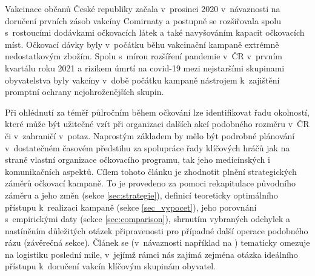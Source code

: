 Vakcinace občanů České republiky začala v~prosinci 2020 v~návaznosti na doručení prvních zásob vakcíny Comirnaty a postupně se rozšiřovala spolu s~rostoucími dodávkami očkovacích látek a také navyšováním kapacit očkovacích míst. %
%
Očkovací dávky byly v~počátku běhu vakcinační kampaně extrémně nedostatkovým zbožím. Spolu s~mírou rozšíření pandemie v~ČR v~prvním kvartálu roku 2021 a rizikem úmrtí na covid-19 mezi nejstaršími skupinami obyvatelstva byly vakcíny v~době počátku kampaně nástrojem k~zajištění promptní ochrany nejohroženějších skupin. %

Při ohlédnutí za téměř půlročním během očkování lze identifikovat řadu okolností, které může být užitečné vzít při organizaci dalších akcí podobného rozměru v~ČR či v~zahraničí v~potaz. Naprostým základem by mělo být podrobné plánování v~dostatečném časovém předstihu za spolupráce řady klíčových hráčů jak na straně vlastní organizace očkovacího programu, tak jeho medicínských i komunikačních aspektů. 
%
Cílem tohoto článku je zhodnotit plnění strategických záměrů očkovací kampaně. To je provedeno za pomoci rekapitulace původního záměru a jeho změn (sekce \ref{sec:strategie}), definicí teoreticky optimálního přístupu k~realizaci kampaně (sekce \ref{sec_vypocet}), jeho porovnání s~empirickými daty (sekce \ref{sec:comparison}), shrnutím vybraných odchylek a nastíněním důležitých otázek připravenosti pro případné další operace podobného rázu (závěrečná sekce).
%
Článek se (v~návaznosti například na \cite{lastmile}) tematicky omezuje na logistiku poslední míle, v~jejímž rámci nás zajímá zejména otázka ideálního přístupu k~doručení vakcín klíčovým skupinám obyvatel.

